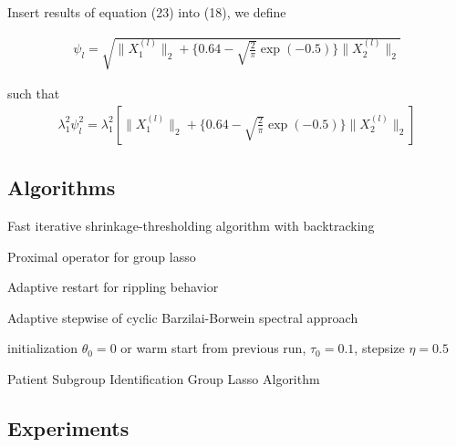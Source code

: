 \documentclass[12pt]{article}
\begin{document}
Insert results of equation (23) into (18), we define

\begin{equation}
  \begin{split}
\psi_l = \sqrt{\parallel X_1^{(l)} \parallel_2 + \{0.64 - \sqrt{\frac{2}{\pi}}\exp(-0.5) \} \parallel X_2^{(l)} \parallel_2} 
\end{split}
\end{equation}

such that
\begin{equation}
  \begin{split}
    \lambda_1^2\psi_l^2 = \lambda_1^2  [ \parallel X_1^{(l)} \parallel_2 + \{0.64 - \sqrt{\frac{2}{\pi}}\exp(-0.5) \} \parallel X_2^{(l)} \parallel_2 ]
  \end{split}
\end{equation}


\subsection*{Algorithms}

Fast iterative shrinkage-thresholding algorithm with backtracking \cite{beck2009fast}

Proximal operator for group lasso \cite{liu2010fast}

Adaptive restart for rippling behavior \cite{o2015adaptive}

Adaptive stepwise of cyclic Barzilai-Borwein spectral approach \cite{wright2009sparse}




\begin{algorithm}[H]
  initialization $\theta_0=0$ or warm start from previous run, $\tau_0=0.1$, stepsize $\eta=0.5$\;
  \caption{Patient Subgroup Identification Group Lasso Algorithm}
 \end{algorithm}
 

\subsection*{Experiments}
\end{document}
